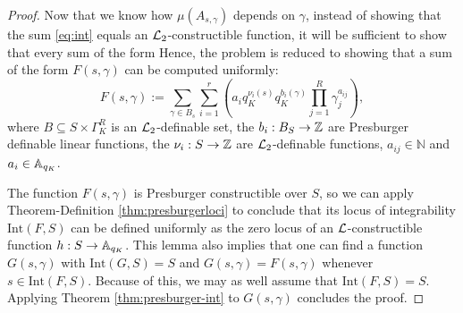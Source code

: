 \begin{proof}
Now that we know how $\mu(A_{s, \gamma})$ depends on $\gamma$, instead of showing that the sum \eqref{eq:int} equals an $\Lm_2$-constructible function, it will be sufficient to show that every sum of the form
%
Hence, the problem is reduced to showing that a sum of the form $F(s,\gamma)$ can be computed uniformly:
\[F(s,\gamma) := \sum_{\gamma \in B_s} \sum_{i=1}^r \left(a_i q_K^{\nu_i(s)}q_K^{b_i(\gamma)} \prod_{j=1}^{R}\gamma_{j}^{a_{ij}}\right),\]
where $B \subseteq S \times \Gamma_K^R$ is an $\Lm_2$-definable set, the $b_i: B_S \to \Z$ are Presburger definable linear functions, the $\nu_i:S \to \Z$ are $\Lm_2$-definable functions,  %
$a_{ij} \in \mathbb{N}$ and $a_i \in \AA_{q_K}$.

The function $F(s,\gamma)$ is Presburger constructible over $S$, so we can apply
Theorem-Definition \ref{thm:presburgerloci} to conclude that its locus of integrability $\text{Int}(F,S)$ can be defined uniformly as the zero locus of an $\Lm$-constructible function $h: S\to \AA_{q_K}$. 
This lemma also implies that one can find a function $G(s,\gamma)$ with $\text{Int}(G,S)= S$ and $G(s,\gamma) = F(s,\gamma)$ whenever $s \in \text{Int}(F,S)$. Because of this, we may as well assume that $\text{Int}(F,S)=S$. Applying Theorem \ref{thm:presburger-int} to $G(s,\gamma)$ concludes the proof.
\end{proof}

